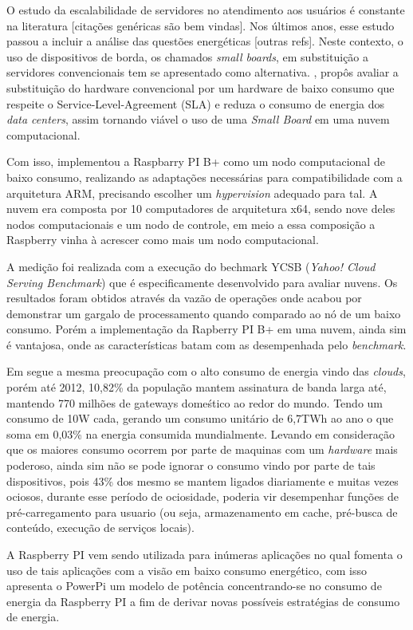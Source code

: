 \documentclass[12pt,english,brazil]{article}
\begin{document}
O estudo da escalabilidade de servidores no atendimento aos usuários é constante na literatura [citações genéricas são bem vindas]. Nos últimos anos, esse estudo passou a incluir a análise das questões energéticas [outras refs]. Neste contexto, o uso de dispositivos de borda, os chamados \emph{small boards}, em substituição a servidores convencionais tem se apresentado como alternativa. \cite{Joao}, propôs avaliar a substituição do hardware convencional por um hardware de baixo consumo que respeite o Service-Level-Agreement (SLA) e reduza o consumo de energia dos \textit{data centers}, assim tornando viável o uso de uma \textit{Small Board} em uma nuvem computacional.

Com isso, implementou a Raspbarry PI B+ como um nodo computacional de baixo consumo, realizando as adaptações necessárias para compatibilidade com a arquitetura ARM, precisando escolher um \textit{hypervision} adequado para tal. A nuvem era composta por 10 computadores de arquitetura x64, sendo nove deles nodos computacionais e um nodo de controle, em meio a essa composição a Raspberry vinha à acrescer como mais um nodo computacional.


A medição foi realizada com a execução do bechmark YCSB (\textit{Yahoo! Cloud Serving Benchmark}) que é especificamente desenvolvido para avaliar nuvens. Os resultados foram obtidos através da vazão de operações onde acabou por demonstrar um gargalo de processamento quando comparado ao nó de um baixo consumo. Porém a implementação da Rapberry PI B+ em uma nuvem, ainda sim é vantajosa, onde as características batam com as desempenhada pelo \textit{benchmark}.


Em \cite{PiConsumo} segue a mesma preocupação com o alto consumo de energia vindo das \textit{clouds}, porém até 2012, 10,82\% da população mantem assinatura de banda larga até, mantendo 770 milhões de gateways domeśtico ao redor do mundo. Tendo um consumo de 10W cada, gerando um consumo unitário de 6,7TWh ao ano o que soma em 0,03\% na energia consumida mundialmente. Levando em consideração que os maiores consumo ocorrem por parte de maquinas com um \textit{hardware} mais poderoso, ainda sim não se pode ignorar o consumo vindo por parte de tais dispositivos, pois 43\% dos mesmo se mantem ligados diariamente e muitas vezes ociosos, durante esse período de ociosidade, poderia vir desempenhar funções de pré-carregamento para usuario (ou seja, armazenamento em cache, pré-busca de conteúdo, execução de serviços locais).


A Raspberry PI vem sendo utilizada para inúmeras aplicações no qual fomenta o uso de tais aplicações com a visão em baixo consumo energético, com isso \cite{PiConsumo} apresenta o PowerPi um modelo de  potência concentrando-se no consumo de energia da Raspberry PI a fim de derivar novas possíveis estratégias de consumo de energia.
\end{document}
